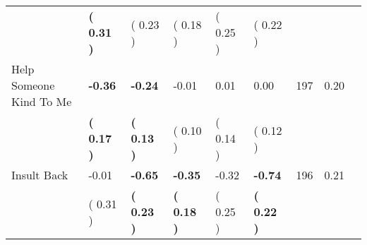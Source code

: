 \begin{tabular}{L{6.2cm} C{1.8cm} C{1.8cm} C{1.8cm} C{1.8cm} C{1.8cm} C{1.8cm} C{0.3cm} C{0.3cm}}
 & \textbf{(     0.31 )} & (     0.23 ) & (     0.18 ) & (     0.25 ) & (     0.22 )  & \\
Help Someone Kind To Me & \textbf{    -0.36} & \textbf{    -0.24} &     -0.01 &      0.01 &      0.00  & 197 &       0.20 \\ 
 & \textbf{(     0.17 )} & \textbf{(     0.13 )} & (     0.10 ) & (     0.14 ) & (     0.12 )  & \\
Insult Back &     -0.01 & \textbf{    -0.65} & \textbf{    -0.35} &     -0.32 & \textbf{    -0.74}  & 196 &       0.21 \\ 
 & (     0.31 ) & \textbf{(     0.23 )} & \textbf{(     0.18 )} & (     0.25 ) & \textbf{(     0.22 )}  & \\
\bottomrule
\end{tabular}
